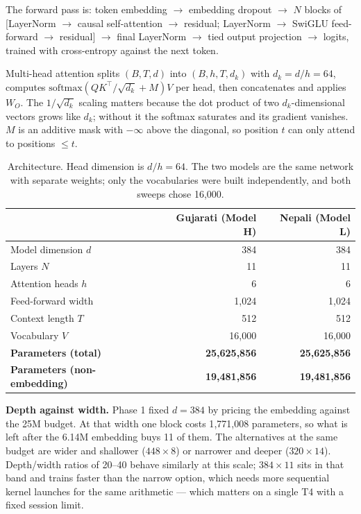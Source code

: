 \documentclass[11pt,a4paper]{article}
\begin{document}
The forward pass is: token embedding $\rightarrow$ embedding dropout
$\rightarrow$ $N$ blocks of [LayerNorm $\rightarrow$ causal self-attention
$\rightarrow$ residual; LayerNorm $\rightarrow$ SwiGLU feed-forward
$\rightarrow$ residual] $\rightarrow$ final LayerNorm $\rightarrow$ tied output
projection $\rightarrow$ logits, trained with cross-entropy against the next
token.

Multi-head attention splits $(B,T,d)$ into $(B,h,T,d_k)$ with $d_k=d/h=64$,
computes $\mathrm{softmax}\!\left(QK^{\top}/\sqrt{d_k} + M\right)V$ per head,
then concatenates and applies $W_O$. The $1/\sqrt{d_k}$ scaling matters because
the dot product of two $d_k$-dimensional vectors grows like $d_k$; without it the
softmax saturates and its gradient vanishes. $M$ is an additive mask with
$-\infty$ above the diagonal, so position $t$ can only attend to positions
$\le t$.


\begin{table}[H]
\centering
\small
\begin{tabular}{lrr}
\toprule
\textbf{} & \textbf{Gujarati (Model H)} & \textbf{Nepali (Model L)} \\
\midrule
Model dimension $d$ & 384 & 384 \\
Layers $N$ & 11 & 11 \\
Attention heads $h$ & 6 & 6 \\
Feed-forward width & 1,024 & 1,024 \\
Context length $T$ & 512 & 512 \\
Vocabulary $V$ & 16,000 & 16,000 \\
\textbf{Parameters (total)} & \textbf{25,625,856} & \textbf{25,625,856} \\
\textbf{Parameters (non-embedding)} & \textbf{19,481,856} & \textbf{19,481,856} \\
\bottomrule
\end{tabular}
\caption{Architecture. Head dimension is $d/h = 64$. The two models are the same network with separate weights; only the vocabularies were built independently, and both sweeps chose 16{,}000.}
\label{tab:arch}
\end{table}



\textbf{Depth against width.} Phase 1 fixed $d=384$ by pricing the embedding
against the 25M budget. At that width one block costs 1{,}771{,}008 parameters,
so what is left after the 6.14M embedding buys 11 of them. The alternatives at
the same budget are wider and shallower ($448\times8$) or narrower and deeper
($320\times14$). Depth/width ratios of 20--40 behave similarly at this scale;
$384\times11$ sits in that band and trains faster than the narrow option, which
needs more sequential kernel launches for the same arithmetic --- which matters
on a single T4 with a fixed session limit.
\end{document}
